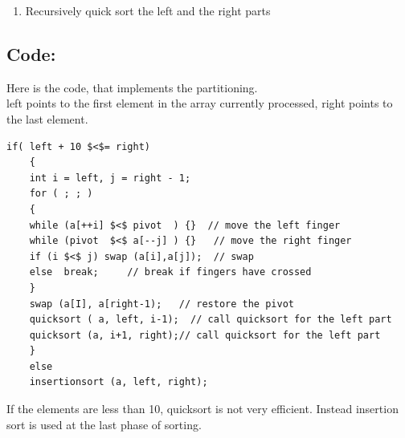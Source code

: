 \documentclass{article}
\begin{document}
\begin{enumerate}
\begin{enumerate}
			[5, 3, 25, 6, 10, 17, 1, 2, 18, 8]\\
			\^\qquad\qquad\qquad\qquad\qquad\qquad\^\\
			i \qquad\qquad\qquad\qquad\qquad\qquad j\\
			\begin{enumerate}
				\item  While i is to the left of j, we move i right, skipping all the elements less than the pivot. If an element is found greater then the pivot, i stops
				\item  While j is to the right of i, we move j left, skipping all the elements greater than the pivot. If an element is found less then the pivot, j stops
				\item  When both i and j have stopped, the elements are swapped.
				\item  When i and j have crossed, no swap is performed, scanning stops, and the element pointed to by i is swapped with the pivot .In the example the first swapping will be between 25 and 2, the second between 10 and 1.
			\end{enumerate}
			3. Restore the pivot.
			After restoring the pivot we obtain the following partitioning into three groups:\\
			$[5, 3, 2, 6, 1] [ 8 ] [10, 25, 18, 17]$
			
		\end{enumerate}
		
		\item Recursively quick sort the left and the right parts
	\end{enumerate}
	
	
	\subsection{Code:}
	Here is the code, that implements the partitioning.\\
	left points to the first element in the array currently processed, right points to the last element. \\
	\lstset{language=C}          
	\begin{lstlisting}[frame=single] 
	if( left + 10 $<$= right)
	{
	int i = left, j = right - 1;
	for ( ; ; )
	{
	while (a[++i] $<$ pivot  ) {}  // move the left finger
	while (pivot  $<$ a[--j] ) {}   // move the right finger
	if (i $<$ j) swap (a[i],a[j]);  // swap       
	else  break;     // break if fingers have crossed
	}
	swap (a[I], a[right-1);   // restore the pivot
	quicksort ( a, left, i-1);  // call quicksort for the left part
	quicksort (a, i+1, right);// call quicksort for the left part
	}
	else 
	insertionsort (a, left, right);
	\end{lstlisting}
	If the elements are less than 10, quicksort is not very efficient. 
	Instead insertion sort is used at the last phase of sorting.
	
\end{document}
